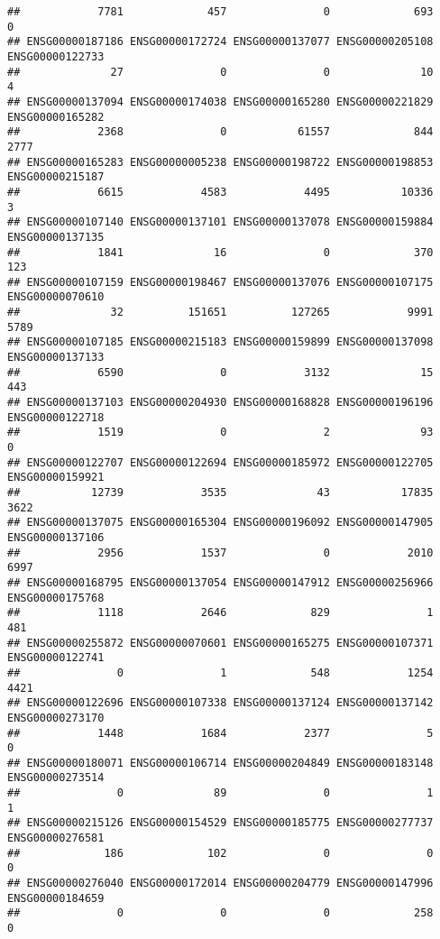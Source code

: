 \documentclass[
]{article}
\begin{document}
\begin{verbatim}
##            7781             457               0             693               0 
## ENSG00000187186 ENSG00000172724 ENSG00000137077 ENSG00000205108 ENSG00000122733 
##              27               0               0              10               4 
## ENSG00000137094 ENSG00000174038 ENSG00000165280 ENSG00000221829 ENSG00000165282 
##            2368               0           61557             844            2777 
## ENSG00000165283 ENSG00000005238 ENSG00000198722 ENSG00000198853 ENSG00000215187 
##            6615            4583            4495           10336               3 
## ENSG00000107140 ENSG00000137101 ENSG00000137078 ENSG00000159884 ENSG00000137135 
##            1841              16               0             370             123 
## ENSG00000107159 ENSG00000198467 ENSG00000137076 ENSG00000107175 ENSG00000070610 
##              32          151651          127265            9991            5789 
## ENSG00000107185 ENSG00000215183 ENSG00000159899 ENSG00000137098 ENSG00000137133 
##            6590               0            3132              15             443 
## ENSG00000137103 ENSG00000204930 ENSG00000168828 ENSG00000196196 ENSG00000122718 
##            1519               0               2              93               0 
## ENSG00000122707 ENSG00000122694 ENSG00000185972 ENSG00000122705 ENSG00000159921 
##           12739            3535              43           17835            3622 
## ENSG00000137075 ENSG00000165304 ENSG00000196092 ENSG00000147905 ENSG00000137106 
##            2956            1537               0            2010            6997 
## ENSG00000168795 ENSG00000137054 ENSG00000147912 ENSG00000256966 ENSG00000175768 
##            1118            2646             829               1             481 
## ENSG00000255872 ENSG00000070601 ENSG00000165275 ENSG00000107371 ENSG00000122741 
##               0               1             548            1254            4421 
## ENSG00000122696 ENSG00000107338 ENSG00000137124 ENSG00000137142 ENSG00000273170 
##            1448            1684            2377               5               0 
## ENSG00000180071 ENSG00000106714 ENSG00000204849 ENSG00000183148 ENSG00000273514 
##               0              89               0               1               1 
## ENSG00000215126 ENSG00000154529 ENSG00000185775 ENSG00000277737 ENSG00000276581 
##             186             102               0               0               0 
## ENSG00000276040 ENSG00000172014 ENSG00000204779 ENSG00000147996 ENSG00000184659 
##               0               0               0             258               0 

\end{verbatim}
\end{document}
